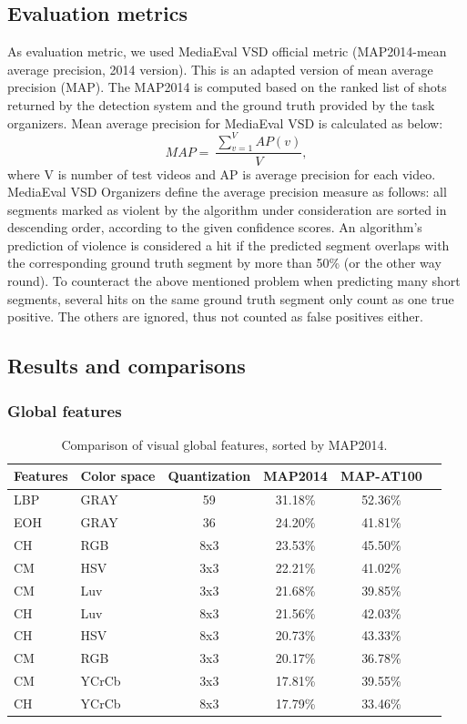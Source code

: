 \documentclass[twocolumn]{bmcart}%
\begin{document}
\subsection{Evaluation metrics}
As evaluation metric, we used MediaEval VSD official metric (MAP2014-mean average precision, 2014 version). This is an adapted version of mean average precision (MAP). The MAP2014 is computed based on the ranked list of shots returned by the detection system and the ground truth provided by the task organizers. Mean average precision for MediaEval VSD  is calculated as below:
\[
MAP=\ \frac{\sum_{v=1}^VAP(v)}{V},
\]
where V is number of test videos and AP is average precision for each video. MediaEval VSD Organizers define the average precision measure as follows: all segments marked as violent by the algorithm under consideration are sorted in descending order, according to the given confidence scores. An algorithm’s prediction of violence is considered a hit if the predicted segment overlaps with the corresponding ground truth segment by more than 50\% (or the other way round). To counteract the above mentioned problem when predicting many short segments, several hits on the same ground truth segment only count as one true positive. The others are ignored, thus not counted as false positives either.
\subsection{Results and comparisons}
\subsubsection{Global features}
\begin{table}
	\centering
	\caption{Comparison of visual global features, sorted by MAP2014.}
	\setlength{\tabcolsep}{4pt}
	\begin{tabular}{llcccc}
		\hline
		Features & Color space & Quantization & MAP2014 & MAP-AT100 \\ \hline
		LBP & GRAY  & 59    & 31.18\% & 52.36\% \\
		EOH & GRAY   & 36    & 24.20\% & 41.81\% \\
		CH & RGB   & 8x3   & 23.53\% & 45.50\% \\
		CM & HSV     & 3x3   & 22.21\% & 41.02\% \\
		CM & Luv      & 3x3   & 21.68\% & 39.85\% \\
		CH & Luv    & 8x3   & 21.56\% & 42.03\% \\
		CH & HSV    & 8x3   & 20.73\% & 43.33\% \\
		CM & RGB     & 3x3   & 20.17\% & 36.78\% \\
		CM & YCrCb   & 3x3   & 17.81\% & 39.55\% \\
		CH & YCrCb   & 8x3   & 17.79\% & 33.46\% \\ \hline
	\end{tabular}%
	\label{tab:global}%
\end{table}%
\end{document}
